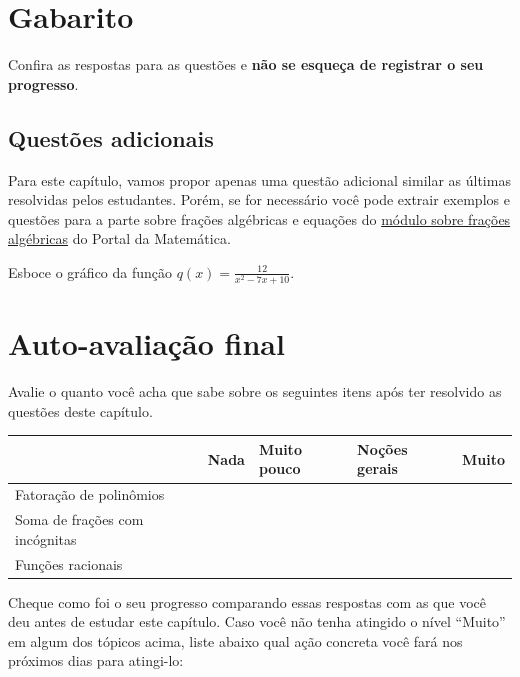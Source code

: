 \documentclass[main.tex]{subfiles}
\begin{document}
\section{Gabarito}

Confira as respostas para as questões e \textbf{não se esqueça de registrar o seu progresso}.

\imprimeGabarito

\paraTutores

\subsection{Questões adicionais}

Para este capítulo, vamos propor apenas uma questão adicional similar as últimas resolvidas pelos estudantes. Porém, se for necessário você pode extrair exemplos e questões para a parte sobre frações algébricas e equações do \href{https://portaldaobmep.impa.br/index.php/modulo/ver?modulo=38}{módulo sobre frações algébricas} do Portal da Matemática.

\begin{adicional}
Esboce o gráfico da função $q(x)=\frac{12}{x^2-7x+10}$.
\end{adicional}

\paraAlunos

\section{Auto-avaliação final}
Avalie o quanto você acha que sabe sobre os seguintes itens após ter resolvido as questões deste capítulo.

\begin{center}
 \begin{tabular}{|p{25mm}||p{10mm}|p{10mm}|p{10mm}|p{10mm}|} 
 \hline
   & Nada & Muito pouco & Noções gerais & Muito\\
 \hline
 Fatoração de polinômios &  &  &  &  \\ 
 \hline
 Soma de frações com incógnitas &  &  &  &  \\
 \hline
 Funções racionais &  &  &  &  \\
 \hline
\end{tabular}
\end{center}

Cheque como foi o seu progresso comparando essas respostas com as que você deu antes de estudar este capítulo. Caso você não tenha atingido o nível ``Muito''  em algum dos tópicos acima, liste abaixo qual ação concreta você fará nos próximos dias para atingi-lo:

\paraAmbos
\end{document}
